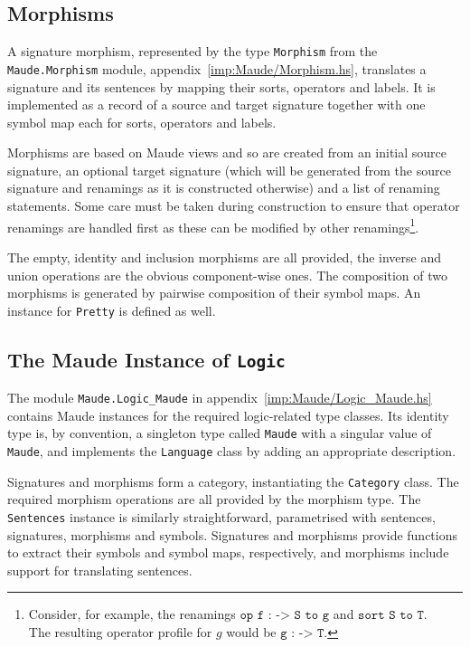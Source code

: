 \documentclass[11pt]{article}
\begin{document}
\subsection{Morphisms}
\label{sub:implementation_morphisms}

A signature morphism, represented by the type \texttt{Morphism} from the \texttt{Maude.Morphism} module, appendix~\ref{imp:Maude/Morphism.hs}, translates a signature and its sentences by mapping their sorts, operators and labels. It is implemented as a record of a source and target signature together with one symbol map each for sorts, operators and labels.

Morphisms are based on Maude views and so are created from an initial source signature, an optional target signature (which will be generated from the source signature and renamings as it is constructed otherwise) and a list of renaming statements. Some care must be taken during construction to ensure that operator renamings are handled first as these can be modified by other renamings\footnote{Consider, for example, the renamings $\texttt{op f : -> S to g}$ and $\texttt{sort S to T}$.\\ The resulting operator profile for $g$ would be $\texttt{g : -> T}$.}.

The empty, identity and inclusion morphisms are all provided, the inverse and union operations are the obvious component-wise ones. The composition of two morphisms is generated by pairwise composition of their symbol maps. An instance for \texttt{Pretty} is defined as well.


\subsection{The Maude Instance of \texttt{Logic}}
\label{sub:implementation_logic_maude}

The module \texttt{Maude.Logic\_Maude} in appendix~\ref{imp:Maude/Logic_Maude.hs} contains Maude instances for the required logic-related type classes. Its identity type is, by convention, a singleton type called \texttt{Maude} with a singular value of \texttt{Maude}, and implements the \texttt{Language} class by adding an appropriate description.

Signatures and morphisms form a category, instantiating the \texttt{Category} class. The required morphism operations are all provided by the morphism type. The \texttt{Sentences} instance is similarly straightforward, parametrised with sentences, signatures, morphisms and symbols. Signatures and morphisms provide functions to extract their symbols and symbol maps, respectively, and morphisms include support for translating sentences.
\end{document}
